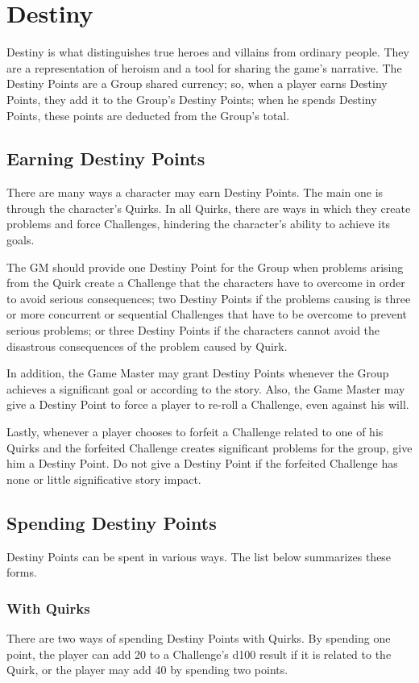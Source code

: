 \section{Destiny}
\begin{multicols}{2}
Destiny is what distinguishes true heroes
and villains from ordinary people. They are a
representation of heroism and a tool for sharing
the game's narrative. The Destiny Points are a
Group shared currency; so, when a player earns
Destiny Points, they add it to the Group’s Destiny
Points; when he spends Destiny Points, these
points are deducted from the Group's total.
\subsection{Earning Destiny Points}
There are many ways a character may earn
Destiny Points. The main one is through the
character's Quirks. In all Quirks, there are ways in
which they create problems and force Challenges,
hindering the character’s ability to achieve its
goals.

The GM should provide one Destiny Point
for the Group when problems arising from the
Quirk create a Challenge that the characters have
to overcome in order to avoid serious
consequences; two Destiny Points if the problems
causing is three or more concurrent or sequential
Challenges that have to be overcome to prevent
serious problems; or three Destiny Points if the
characters cannot avoid the disastrous
consequences of the problem caused by Quirk.

In addition, the Game Master may grant
Destiny Points whenever the Group achieves a
significant goal or according to the story. Also, the
Game Master may give a Destiny Point to force a
player to re-roll a Challenge, even against his will.

Lastly, whenever a player chooses to forfeit
a Challenge related to one of his Quirks and the
forfeited Challenge creates significant problems
for the group, give him a Destiny Point. Do not give
a Destiny Point if the forfeited Challenge has none
or little significative story impact.
\subsection{Spending Destiny Points}
Destiny Points can be spent in various
ways. The list below summarizes these forms.

\subsubsection{With Quirks}
There are two ways of spending Destiny
Points with Quirks. By spending one point, the
player can add 20 to a Challenge's d100 result if it
is related to the Quirk, or the player may add 40 by
spending two points.


\end{multicols}
